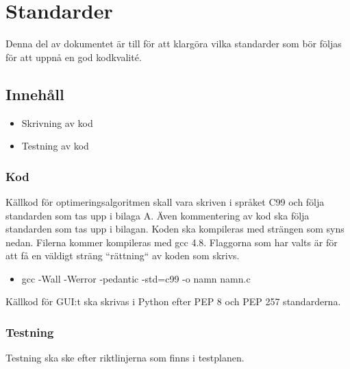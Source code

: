 \section{Standarder}
Denna del av dokumentet är till för att klargöra vilka standarder som bör följas för att uppnå en god kodkvalité.

\subsection{Innehåll}
\begin{itemize}
\item Skrivning av kod
\item Testning av kod
\end{itemize}

\subsubsection{Kod}
Källkod för optimeringsalgoritmen skall vara skriven i språket C99 och följa standarden som tas upp i bilaga A. Även kommentering av kod ska följa standarden som tas upp i bilagan. 
\newline
\newline
Koden ska kompileras med strängen som syns nedan. Filerna kommer kompileras med gcc 4.8. Flaggorna som har valts är för att få en väldigt sträng ``rättning`` av koden som skrivs. 

\begin{itemize}
\item gcc -Wall -Werror -pedantic -std=c99 -o namn namn.c
\end{itemize}

Källkod för GUI:t ska skrivas i Python efter PEP 8 och PEP 257 standarderna. 

\subsubsection{Testning}
Testning ska ske efter riktlinjerna som finns i testplanen.
